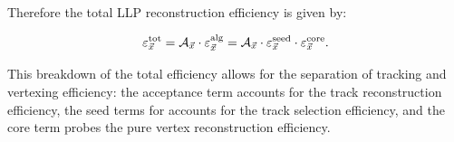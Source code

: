 \documentclass[PUB,UKenglish, texlive=2018]{\ATLASLATEXPATH atlasdoc}
\begin{document}



Therefore the total LLP reconstruction efficiency is given by:

\begin{equation}
\varepsilon_{\vec{x}}^{\rm tot} = {\cal A}_{\vec{x}}\cdot \varepsilon_{\vec{x}}^{\rm alg} = {\cal A}_{\vec{x}}\cdot \varepsilon_{\vec{x}}^{\rm seed} \cdot \varepsilon_{\vec{x}}^{\rm core}.
\end{equation}

This breakdown of the total efficiency allows for the separation of tracking and vertexing efficiency:
the acceptance term accounts for the track reconstruction efficiency, the seed terms for accounts for the track selection efficiency, and the core term probes the pure vertex reconstruction efficiency. %
\end{document}
